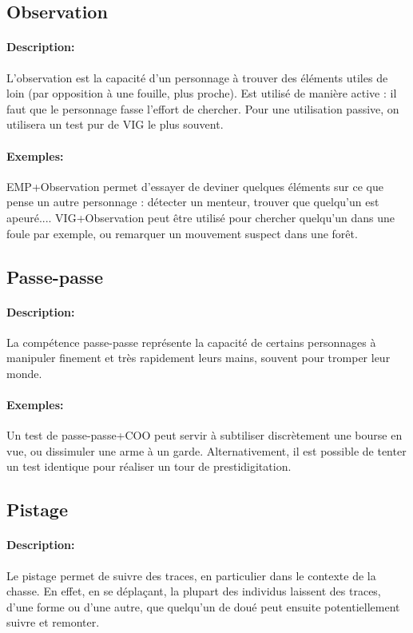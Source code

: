 \documentclass[10pt,a4paper,twocolumn]{book}
\begin{document}
\subsection{Observation}%
\paragraph{Description:}L'observation est la capacité d'un personnage à trouver des éléments utiles de loin (par opposition à une fouille, plus proche). Est utilisé de manière active : il faut que le personnage fasse l'effort de chercher. Pour une utilisation passive, on utilisera un test pur de VIG le plus souvent.
\paragraph{Exemples:}EMP+Observation permet d'essayer de deviner quelques éléments sur ce que pense un autre personnage : détecter un menteur, trouver que quelqu'un est apeuré.... VIG+Observation peut être utilisé pour chercher quelqu'un dans une foule par exemple, ou remarquer un mouvement suspect dans une forêt.
\subsection{Passe-passe}
\paragraph{Description:}La compétence passe-passe représente la capacité de certains personnages à manipuler finement et très rapidement leurs mains, souvent pour tromper leur monde.
\paragraph{Exemples:}Un test de passe-passe+COO peut servir à subtiliser discrètement une bourse en vue, ou dissimuler une arme à un garde. Alternativement, il est possible de tenter un test identique pour réaliser un tour de prestidigitation.
\subsection{Pistage}
\paragraph{Description:}Le pistage permet de suivre des traces, en particulier dans le contexte de la chasse. En effet, en se déplaçant, la plupart des individus laissent des traces, d'une forme ou d'une autre, que quelqu'un de doué peut ensuite potentiellement suivre et remonter.
\end{document}
